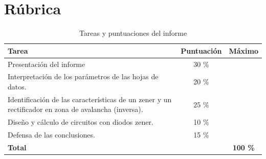 \inicioCodigo{}

\par\vspace{10pt}\par
	\section{Rúbrica}

\begin{table}[h!]
\centering
\renewcommand{\arraystretch}{1.5}
\begin{tabular}{|>{\raggedright}p{8cm}|c|c|}
\hline
\rowcolor[HTML]{D9D9D9}
\textbf{Tarea} & \textbf{Puntuación} & \textbf{Máximo} \\
\hline
\cellcolor[HTML]{E6E6E6} Presentación del informe & 30 \% & \\
\hline
\cellcolor[HTML]{E6E6E6} Interpretación de los parámetros de las hojas de datos. & 20 \% & \\
\hline
\cellcolor[HTML]{E6E6E6} Identificación de las características de un zener y un rectificador en zona de avalancha (inversa). & 25 \% & \\
\hline
\cellcolor[HTML]{E6E6E6} Diseño y cálculo de circuitos con diodos zener. & 10 \% & \\
\hline
\cellcolor[HTML]{E6E6E6} Defensa de las conclusiones. & 15 \% & \\
\hline
\rowcolor[HTML]{C0C0C0} \textbf{Total} & & \textbf{100 \%} \\
\hline
\end{tabular}
\caption{Tareas y puntuaciones del informe}
\end{table}
\finalCodigo{}
